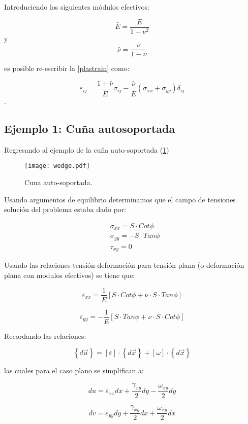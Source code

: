 \documentclass[../notas medios.tex]{subfiles}
\begin{document}
Introduciendo los siguientes módulos efectivos:


\[\bar E = \frac{E}{{1 - {\nu ^2}}}\]
y
\[\bar \nu  = \frac{\nu }{{1 - \nu }}\]

es posible re-escribir la \cref{plastrain} como:


\[{\varepsilon _{ij}} = \frac{{1 + \bar \nu }}{{\bar E}}{\sigma _{ij}} - \frac{{\bar \nu }}{{\bar E}}({\sigma _{xx}} + {\sigma _{yy}}){\delta _{ij}}\].

\subsection*{Ejemplo 1: Cuña autosoportada}
Regresando al ejemplo de la cuña auto-soportada (\cref{wedgee})


\begin{figure}[H]
\centering
	\texttt{[image: wedge.pdf]}
	\caption{Cuna auto-soportada.}
	\label{wedgee}
\end{figure}


Usando argumentos de equilibrio determinamos que el campo de tensiones solución del problema estaba dado por:

\begin{equation} \label{tencuna}
\begin{split}
& {\sigma _{xx}} = S \cdot Cot\phi \\
& {\sigma _{yy}} =  - S \cdot Tan\phi \\
& {\tau _{xy}} = 0
\end{split}
\end{equation}

Usando las relaciones tensión-deformación para tensión plana (o deformación plana con modulos efectivos) se tiene que:


\[{\varepsilon _{xx}} = \frac{1}{E}\left[ {S \cdot Cot\phi  + \nu  \cdot S \cdot Tan\phi } \right]\]

\[{\varepsilon _{yy}} =  - \frac{1}{E}\left[ {S \cdot Tan\phi  + \nu  \cdot S \cdot Cot\phi } \right]\]

Recordando las relaciones:

\[\left\{ {d\vec u} \right\} = \left[ \varepsilon  \right] \cdot \left\{ {d\vec x} \right\} + \left[ \omega  \right] \cdot \left\{ {d\vec x} \right\}\]

las cuales para el caso plano se simplifican a:

\[du = {\varepsilon _{xx}}dx + \frac{{{\gamma _{xy}}}}{2}dy - \frac{{{\omega _{xy}}}}{2}dy\]

\[dv = {\varepsilon _{yy}}dy + \frac{{{\gamma _{xy}}}}{2}dx + \frac{{{\omega _{xy}}}}{2}dx\]
\end{document}
